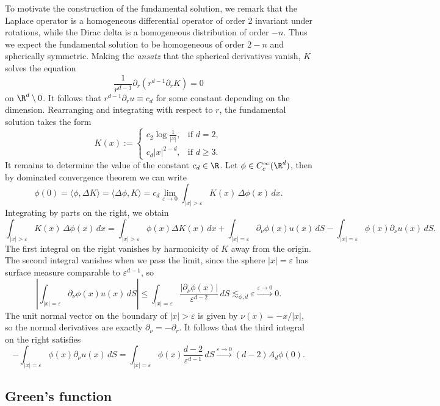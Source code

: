 \documentclass[reqno]{amsart}
\theoremstyle{definition}
\theoremstyle{remark}
\renewcommand{\epsilon}{\varepsilon}
\begin{document}
To motivate the construction of the fundamental solution, we remark that the Laplace operator is a homogeneous differential operator of order 2 invariant under rotations, while the Dirac delta is a homogeneous distribution of order $-n$. Thus we expect the fundamental solution to be homogeneous of order $2 - n$ and spherically symmetric. Making the \textit{ansatz} that the spherical derivatives vanish, $K$ solves the equation
	\[ \frac{1}{r^{d - 1}} \partial_r \left( r^{d - 1} \partial_r K \right) = 0 \]
on $\R^d \setminus 0$. It follows that $r^{d - 1} \partial_r u \equiv c_d$ for some constant depending on the dimension. Rearranging and integrating with respect to $r$, the fundamental solution takes the form
	\[ K(x) :=
		\begin{cases}
			c_2 \log \frac{1}{|x|}, 		&\text{if } d = 2, \\
			c_d |x|^{2 - d} ,	&\text{if } d \geq 3.
		\end{cases}
	 \]
It remains to determine the value of the constant $c_d \in \R$. Let $\phi \in C^\infty_c (\R^d)$, then by dominated convergence theorem we can write
	\[ \phi(0) = \langle \phi, \Delta K \rangle = \langle \Delta \phi, K \rangle = c_d \lim_{\epsilon \to 0} \int_{|x| > \epsilon} K(x) \, \Delta \phi(x) \, dx. \] 
Integrating by parts on the right, we obtain
	\[ \int_{|x| > \epsilon} K(x) \, \Delta \phi(x) \, dx = \int_{|x| > \epsilon} \phi(x) \Delta K (x) \, dx + \int_{|x| = \epsilon} \partial_\nu \phi (x) u(x) \, d S - \int_{|x| = \epsilon} \phi(x) \partial_\nu u (x) \, d S. \]
The first integral on the right vanishes by harmonicity of $K$ away from the origin. The second integral vanishes when we pass the limit, since the sphere $|x| = \epsilon$ has surface measure comparable to $\epsilon^{d - 1}$, so 
	\[\left| \int_{|x| = \epsilon} \partial_\nu \phi (x) u(x) \, d S \right| \leq \int_{|x| = \epsilon} \frac{|\partial_\nu \phi(x)|}{\epsilon^{d - 2}} \, dS \lesssim_{\phi, d} \epsilon \overset{\epsilon \to 0}{\longrightarrow} 0. \]	
The unit normal vector on the boundary of $|x| > \epsilon$ is given by $\nu(x) = -x /|x|$, so the normal derivatives are exactly $\partial_\nu = - \partial_r$. It follows that the third integral on the right satisfies
	\[ - \int_{|x| = \epsilon} \phi(x) \partial_\nu u (x) \, d S = \int_{|x| = \epsilon} \phi (x) \frac{d - 2}{\epsilon^{d - 1}} \, dS \overset{\epsilon \to 0}{\longrightarrow} (d - 2) A_d \phi(0). \]



\subsection{Green's function}
\end{document}
